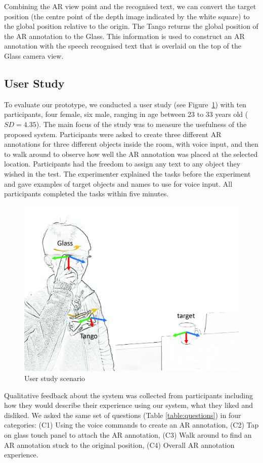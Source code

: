 Combining the AR view point and the recognised text, we can convert the target position (the centre point of the depth image indicated by the white square) to the global position relative to the origin. The Tango returns the global position of the AR annotation to the Glass. This information is used to construct an AR annotation with the speech recognised text that is overlaid on the top of the Glass camera view.

\subsection{User Study}

To evaluate our prototype, we conducted a user study (see Figure~\ref{fig:mgia15:scenario}) with ten participants, four female, six male, ranging in age between 23 to 33 years old ($SD= 4.35$). The main focus of the study was to measure the usefulness of the proposed system. Participants were asked to create three different AR annotations for three different objects inside the room, with voice input, and then to walk around to observe how well the AR annotation was placed at the selected location. Participants had the freedom to assign any text to any object they wished in the test. The experimenter explained the tasks before the experiment and gave examples of target objects and names to use for voice input. All participants completed the tasks within five minutes. 

\begin{figure}[ht]
  \centering
  \includegraphics[width=0.8\linewidth]{images/mgia15/axis_lo.jpg}
  \caption{User study scenario}
  \label{fig:mgia15:scenario}
\end{figure}

Qualitative feedback about the system was collected from participants including how they would describe their experience using our system, what they liked and disliked. We asked the same set of questions (Table \ref{table:questions}) in four categories: (C1) Using the voice commands to create an AR annotation, (C2) Tap on glass touch panel to attach the AR annotation, (C3)  Walk around to find an AR annotation stuck to the original position, (C4) Overall AR annotation experience.

